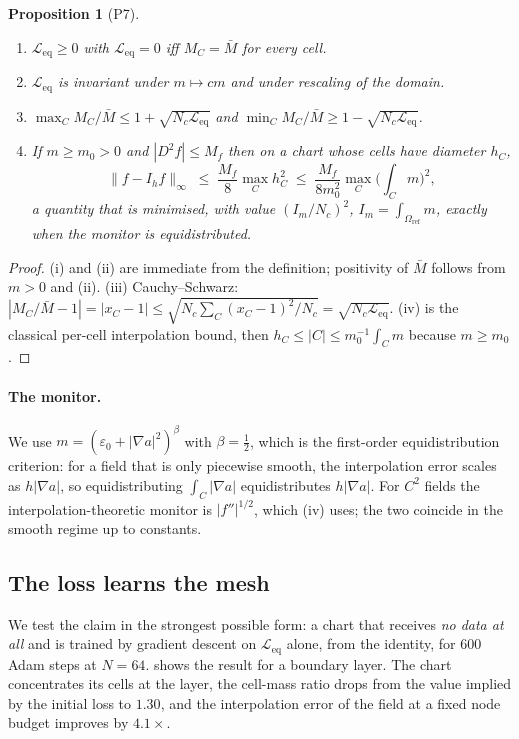 \documentclass[11pt,a4paper]{article}
\theoremstyle{plain}
\newtheorem{proposition}[theorem]{Proposition}
\theoremstyle{definition}
\newcommand{\Leq}{\mathcal{L}_{\mathrm{eq}}}
\newcommand{\Om}{\Omega_{\mathrm{ref}}}
\begin{document}
\begin{proposition}[P7]
\label{prop:eq}
\begin{enumerate}
\item[(i)] $\Leq\ge0$ with $\Leq=0$ \emph{iff} $M_C=\bar M$ for every cell.
\item[(ii)] $\Leq$ is invariant under $m\mapsto cm$ and under rescaling of the
  domain.
\item[(iii)] $\max_C M_C/\bar M\le 1+\sqrt{N_c\Leq}$ and
  $\min_C M_C/\bar M\ge1-\sqrt{N_c\Leq}$.
\item[(iv)] If $m\ge m_0>0$ and $|D^2f|\le M_f$ then on a chart whose cells have
  diameter $h_C$,
  \begin{equation}
    \|f-I_hf\|_\infty\;\le\;\frac{M_f}{8}\max_C h_C^{2}
    \;\le\;\frac{M_f}{8m_0^{2}}\max_C\Big(\int_C m\Big)^{2},
  \end{equation}
  a quantity that is minimised, with value $(I_m/N_c)^2$, $I_m=\int_\Om m$,
  exactly when the monitor is equidistributed.
\end{enumerate}
\end{proposition}

\begin{proof}
(i) and (ii) are immediate from the definition; positivity of $\bar M$ follows
from $m>0$ and (ii).  (iii) Cauchy–Schwarz:
$|M_C/\bar M-1|=|x_C-1|\le\sqrt{N_c\sum_C(x_C-1)^2/N_c}=\sqrt{N_c\Leq}$.
(iv) is the classical per-cell interpolation bound, then
$h_C\le|C|\le m_0^{-1}\int_C m$ because $m\ge m_0$.
\end{proof}

\paragraph{The monitor.}  We use $m=(\varepsilon_0+|\nabla a|^{2})^{\beta}$ with
$\beta=\tfrac12$, which is the first-order equidistribution criterion: for a
field that is only piecewise smooth, the interpolation error scales as
$h|\nabla a|$, so equidistributing $\int_C|\nabla a|$ equidistributes $h|\nabla a|$.
For $C^2$ fields the interpolation-theoretic monitor is $|f''|^{1/2}$, which
(iv) uses; the two coincide in the smooth regime up to constants.

\subsection{The loss learns the mesh}

We test the claim in the strongest possible form: a chart that receives
\emph{no data at all} and is trained by gradient descent on $\Leq$ alone, from
the identity, for $600$ Adam steps at $N=64$.   shows the
result for a boundary layer.  The chart concentrates its cells at the layer, the
cell-mass ratio drops from the value implied by the initial loss to $1.30$, and
the interpolation error of the field at a fixed node budget improves by
$4.1\times$.
\end{document}
